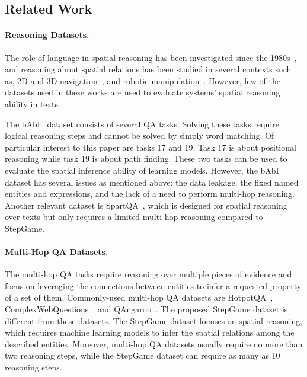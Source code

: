 \documentclass[letterpaper]{article} \usepackage{aaai22}  \usepackage{times}  \usepackage{helvet}  \usepackage{courier}  \usepackage[hyphens]{url}  \usepackage{graphicx} \urlstyle{rm} \def\UrlFont{\rm}  \usepackage{natbib}  \usepackage{caption} \DeclareCaptionStyle{ruled}{labelfont=normalfont,labelsep=colon,strut=off} \frenchspacing  \setlength{\pdfpagewidth}{8.5in}  \setlength{\pdfpageheight}{11in}  \usepackage{algorithm}
\begin{document}
\subsection{Related Work}

\paragraph{Reasoning Datasets.}
The role of language in spatial reasoning has been investigated since the 1980s~\cite{herskovits1987language, gershman2015phrase, tversky2019mind}, and
reasoning about spatial relations has been studied in several contexts such as, 2D and 3D navigation~\cite{bisk2018learning, tan2018source, janner2018representation,yang2020robust}, and robotic manipulation~\cite{landsiedel2017review}. However, few of the datasets used in these works are used to evaluate systems' spatial reasoning ability in texts.

The bAbI~\cite{weston2015towards} dataset consists of several QA tasks. Solving these tasks require logical reasoning steps and cannot be solved by simply word matching. Of particular interest to this paper are tasks 17 and 19. Task 17 is about positional reasoning while task 19 is about path finding. These two tasks can be used to evaluate the spatial inference ability of learning models. However, the bAbI dataset has several issues as mentioned above: the data leakage, the fixed named entities and expressions, and the lack of a need to perform multi-hop reasoning. 
Another relevant dataset is SpartQA~\cite{mirzaee2021spartqa}, which is designed for spatial reasoning over texts but only requires a limited multi-hop reasoning compared to StepGame.

\paragraph{Multi-Hop QA Datasets.}
The multi-hop QA tasks require reasoning over multiple pieces of evidence and focus on leveraging the connections between entities to infer a requested property of a set of them. Commonly-used multi-hop QA datasets are HotpotQA~\cite{yang2018hotpotqa}, Complex\-Web\-Questions~\cite{talmor2018web}, and QAngaroo~\cite{welbl2018constructing}. The proposed StepGame dataset is different from these datasets.
The StepGame dataset focuses on spatial reasoning, which requires machine learning models to infer  the spatial relations among the described entities. Moreover, multi-hop QA datasets usually require no more than two reasoning steps, while the StepGame dataset can require as many as 10 reasoning steps.
\end{document}
